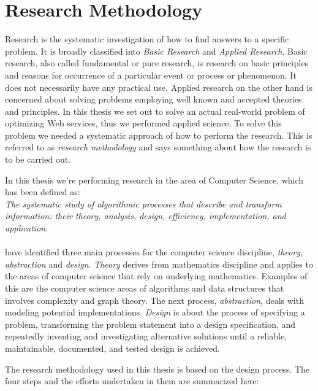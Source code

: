 \section{Research Methodology}

Research is the systematic investigation of how to find answers to a specific
problem. It is broadly classified into \textit{Basic Research} and
\textit{Applied Research}\cite{rajasekar2006research}. Basic research, also
called fundamental or pure research, is research on basic principles and reasons
for occurrence of a particular event or process or phenomenon. It does not
necessarily have any practical use. Applied research on the other hand is
concerned about solving problems employing well known and accepted theories and
principles. In this thesis we set out to solve an actual real-world problem of
optimizing Web services, thus we performed applied science. To solve this
problem we needed a systematic approach of how to perform the research. This is
referred  to as \textit{research methodology} and says something about how the
research is to be carried out.

In this thesis we're performing research in the area of Computer Science, which
has been defined as\cite{denning}: \\

\textit{The systematic study of algorithmic processes that
describe and transform information: their theory, analysis, design, efficiency,
implementation, and application}.

\paragraph{}

 \citeauthor{denning} have identified three main processes for the computer science
 discipline, \textit{theory, abstraction} and \textit{design}\cite{denning}.
 \textit{Theory} derives from mathematics discipline and applies to the areas of
 computer science that rely on underlying mathematics. Examples of this are
 the computer science areas of algorithms and data structures that involves
 complexity and graph theory. The next process, \textit{abstraction}, deals with
 modeling potential implementations. \textit{Design} is about the process of
 specifying a problem, transforming the problem statement into a design
 specification, and repeatedly inventing and investigating alternative solutions
 until a reliable, maintainable, documented, and tested design is achieved.

The research methodology used in this thesis is based on the design process. The four steps and the efforts undertaken in them are summarized here:


